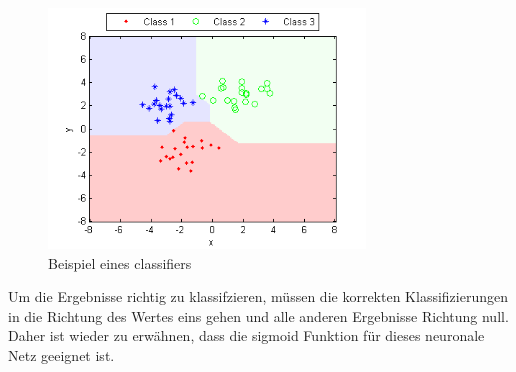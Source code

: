 \begin{figure}[H]
	\centering
		\includegraphics[width=0.75\textwidth]{images/nn_classifier.png}
	\caption{Beispiel eines classifiers}
	\label{fig:nn_class}
\end{figure}

Um die Ergebnisse richtig zu klassifzieren, müssen die korrekten Klassifizierungen in die Richtung des Wertes eins gehen und alle anderen Ergebnisse Richtung null. Daher ist wieder zu erwähnen, dass die sigmoid Funktion für dieses neuronale Netz geeignet ist.

